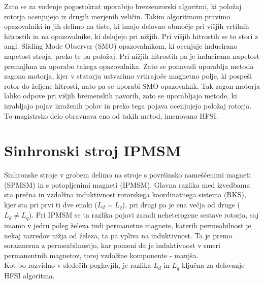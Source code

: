 \documentclass[a4paper,twoside,openright,12pt,slovene]{book}
\begin{document}
Zato se za vodenje pogostokrat uporabijo brezsenzorski algoritmi, ki položaj rotorja ocenjujejo iz drugih merjenih veličin. Takim algoritmom pravimo opazovalniki in jih delimo na tiste, ki imajo
delovno območje pri višjih vrtilnih hitrostih in na opazovalnike, ki delujejo pri nižjih. Pri višjih hitrostih se to stori z angl. Sliding Mode Observer (SMO) opazovalnikom, ki ocenjuje inducirano
napetost stroja, preko te pa položaj. Pri nižjih hitrostih pa je inducirana napetost premajhna za uporabo takega opazovalnika. Zato se ponavadi uporablja metoda zagona motorja, kjer v statorju
ustvarimo vrtirajoče magnetno polje, ki pospeši rotor do željene hitrosti, nato pa se uporabi SMO opazovalnik. Tak zagon motorja lahko odpove pri višjih bremenskih navorih, zato se uporabljajo metode,
ki izrabljajo pojav izraženih polov in preko tega pojava ocenjujejo položaj rotorja. To magistrsko delo obravnava eno od takih metod, imenovano HFSI.


\chapter{Sinhronski stroj IPMSM} \label{sinhronskiStroj}

Sinhronske stroje v grobem delimo na stroje s površinsko nameščenimi magneti (SPMSM) in s potopljenimi magneti (IPMSM). Glavna razlika med izvedbama sta prečna in vzdolžna induktivnost rotorskega
koordinatnega sistema (RKS), kjer sta pri prvi ti dve enaki ($L_d = L_q$), pri drugi pa je ena večja od druge ($L_d \neq L_q$). Pri IPMSM se ta razlika pojavi zaradi neheterogene sestave rotorja, saj
imamo v jedru poleg železa tudi permanetne magnete, katerih permeabilnost je nekaj razredov nižja od železa, ta pa vpliva na induktivnost. Ta je premo sorazmerna z permeabilnostjo, kar pomeni da je
induktivnost v smeri permanentnih magnetov, torej vzdolžne komponente - manjša. \\
Kot bo razvidno v sledečih poglavjih, je razlika $L_d$ in $L_q$ ključna za delovanje HFSI algoritma. 
\end{document}
